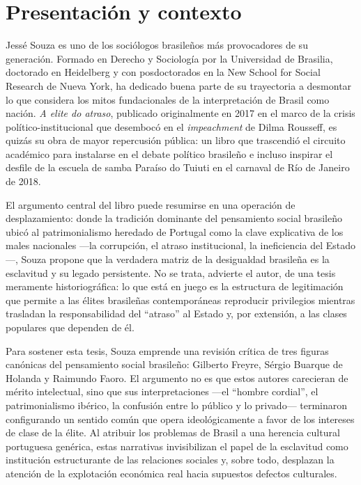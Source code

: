 \documentclass{article}
\begin{document}
\section{Presentación y contexto}
Jessé Souza es uno de los sociólogos brasileños más provocadores de su generación. Formado en Derecho y Sociología por la Universidad de Brasilia, doctorado en Heidelberg y con posdoctorados en la New School for Social Research de Nueva York, ha dedicado buena parte de su trayectoria a desmontar lo que considera los mitos fundacionales de la interpretación de Brasil como nación. \textit{A elite do atraso}, publicado originalmente en 2017 en el marco de la crisis político-institucional que desembocó en el \textit{impeachment} de Dilma Rousseff, es quizás su obra de mayor repercusión pública: un libro que trascendió el circuito académico para instalarse en el debate político brasileño e incluso inspirar el desfile de la escuela de samba Paraíso do Tuiuti en el carnaval de Río de Janeiro de 2018.

El argumento central del libro puede resumirse en una operación de desplazamiento: donde la tradición dominante del pensamiento social brasileño ubicó al patrimonialismo heredado de Portugal como la clave explicativa de los males nacionales —la corrupción, el atraso institucional, la ineficiencia del Estado—, Souza propone que la verdadera matriz de la desigualdad brasileña es la esclavitud y su legado persistente. No se trata, advierte el autor, de una tesis meramente historiográfica: lo que está en juego es la estructura de legitimación que permite a las élites brasileñas contemporáneas reproducir privilegios mientras trasladan la responsabilidad del “atraso” al Estado y, por extensión, a las clases populares que dependen de él.

Para sostener esta tesis, Souza emprende una revisión crítica de tres figuras canónicas del pensamiento social brasileño: Gilberto Freyre, Sérgio Buarque de Holanda y Raimundo Faoro. El argumento no es que estos autores carecieran de mérito intelectual, sino que sus interpretaciones —el “hombre cordial”, el patrimonialismo ibérico, la confusión entre lo público y lo privado— terminaron configurando un sentido común que opera ideológicamente a favor de los intereses de clase de la élite. Al atribuir los problemas de Brasil a una herencia cultural portuguesa genérica, estas narrativas invisibilizan el papel de la esclavitud como institución estructurante de las relaciones sociales y, sobre todo, desplazan la atención de la explotación económica real hacia supuestos defectos culturales.
\end{document}
